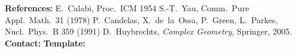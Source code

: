 \documentclass[12pt]{article}
\begin{document}
\begin{posterfooter}
  \textbf{References:}\;
  E.~Calabi, Proc.\ ICM 1954 \textperiodcentered\;
  S.-T.~Yau, Comm.\ Pure Appl.\ Math.\ 31 (1978) \textperiodcentered\;
  P.~Candelas, X.~de~la~Ossa, P.~Green, L.~Parkes, Nucl.\ Phys.\ B 359 (1991) \textperiodcentered\;
  D.~Huybrechts, \emph{Complex Geometry}, Springer, 2005.\quad
  \textbf{Contact:}\; \href{mailto:\PosterContact}{\PosterContact}\quad
  \textbf{Template:}\; \href{\PosterURL}{\PosterURLShort}
\end{posterfooter}
\end{document}
